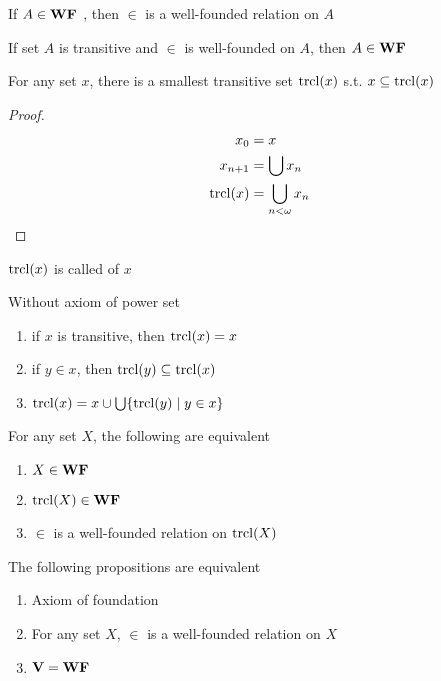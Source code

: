 \documentclass[11pt]{article}
\begin{document}
\begin{theorem}[]
If \(A\in\textbf{WF }\), then \(\in\) is a well-founded relation on \(A\)
\end{theorem}

\begin{lemma}[]
If set \(A\) is transitive and \(\in\) is well-founded on \(A\), then \(A\in\textbf{WF }\)
\end{lemma}

\begin{lemma}[]
For any set \(x\), there is a smallest transitive set \(\mathrm{trcl}{(x)}\) s.t.
\(x\subseteq\mathrm{trcl}{(x)}\) 
\end{lemma}

\begin{proof}
\begin{align*}
x_0&=x\\
x_{n+1}&=\bigcup x_n\\
\mathrm{trcl}{(x)}&=\displaystyle\bigcup_{n<\omega}x_n
\end{align*}
\end{proof}

\(\mathrm{trcl}{(x)}\) is called  of \(x\)


\begin{lemma}[]
Without axiom of power set
\begin{enumerate}
\item if \(x\) is transitive, then \(\mathrm{trcl}{(x)}=x\)
\item if \(y\in x\), then \(\mathrm{trcl}{(y)}\subseteq\mathrm{trcl}{(x)}\)
\item \(\mathrm{trcl}{(x)}=x\cup\bigcup\{\mathrm{trcl}{(y)}\mid y\in x\}\)
\end{enumerate}
\end{lemma}

\begin{theorem}[]
For any set \(X\), the following are equivalent
\begin{enumerate}
\item \(X\in\textbf{WF }\)
\item \(\mathrm{trcl}{(X)}\in\textbf{WF }\)
\item \(\in\) is a well-founded relation on \(\mathrm{trcl}{(X)}\)
\end{enumerate}
\end{theorem}

\begin{theorem}[]
The following propositions are equivalent
\begin{enumerate}
\item Axiom of foundation
\item For any set \(X\), \(\in\) is a well-founded relation on \(X\)
\item \(\textbf{V}=\textbf{WF }\)
\end{enumerate}
\end{theorem}
\end{document}
